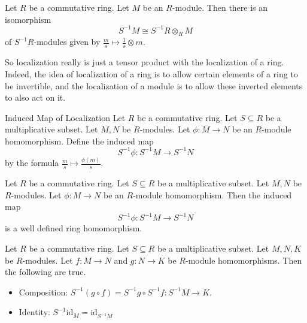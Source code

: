 \documentclass[a4paper]{article}
\begin{document}
\begin{prp}{}{} Let $R$ be a commutative ring. Let $M$ be an $R$-module. Then there is an isomorphism $$S^{-1}M\cong S^{-1}R\otimes_RM$$ of $S^{-1}R$-modules given by $\frac{m}{s}\mapsto\frac{1}{s}\otimes m$. 
\end{prp}

So localization really is just a tensor product with the localization of a ring. Indeed, the idea of localization of a ring is to allow certain elements of a ring to be invertible, and the localization of a module is to allow these inverted elements to also act on it. 

\begin{defn}{Induced Map of Localization}{} Let $R$ be a commutative ring. Let $S\subseteq R$ be a multiplicative subset. Let $M,N$ be $R$-modules. Let $\phi:M\to N$ be an $R$-module homomorphism. Define the induced map $$S^{-1}\phi:S^{-1}M\to S^{-1}N$$ by the formula $\frac{m}{s}\mapsto\frac{\phi(m)}{s}$. 
\end{defn}

\begin{lmm}{}{} Let $R$ be a commutative ring. Let $S\subseteq R$ be a multiplicative subset. Let $M,N$ be $R$-modules. Let $\phi:M\to N$ be an $R$-module homomorphism. Then the induced map $$S^{-1}\phi:S^{-1}M\to S^{-1}N$$ is a well defined ring homomorphism. 
\end{lmm}

\begin{lmm}{}{} Let $R$ be a commutative ring. Let $S\subseteq R$ be a multiplicative subset. Let $M,N,K$ be $R$-modules. Let $f:M\to N$ and $g:N\to K$ be $R$-module homomorphisms. Then the following are true. 
\begin{itemize}
\item Composition: $S^{-1}(g\circ f)=S^{-1}g\circ S^{-1}f:S^{-1}M\to K$. 
\item Identity: $S^{-1}\text{id}_M=\text{id}_{S^{-1}M}$
\end{itemize}
\end{lmm}
\end{document}
